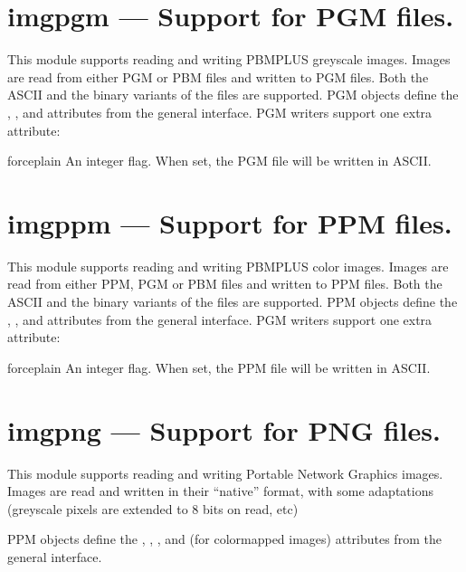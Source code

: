 \section{imgpgm ---
	Support for PGM files.}

This module supports reading and writing PBMPLUS greyscale
images. Images are read from either PGM or PBM files and written to
PGM files. Both the ASCII and the binary variants of the files are
supported.
PGM objects define the , ,  and
 attributes from the general interface. PGM
writers support one extra attribute:

\begin{memberdesc}[imgpgmwriter]{forceplain}
An integer flag. When set, the PGM file will be written in ASCII.
\end{memberdesc}


\section{imgppm ---
	Support for PPM files.}
This module supports reading and writing PBMPLUS color
images. Images are read from either PPM, PGM or PBM files and written to
PPM files. Both the ASCII and the binary variants of the files are
supported.
PPM objects define the , ,  and
 attributes from the general interface. PGM
writers support one extra attribute:

\begin{memberdesc}[imgppmwriter]{forceplain}
An integer flag. When set, the PPM file will be written in ASCII.
\end{memberdesc}

\section{imgpng ---
	Support for PNG files.}
This module supports reading and writing Portable Network Graphics
images. Images are read and written in their ``native'' format, with
some adaptations (greyscale pixels are extended to 8 bits on read, etc)

PPM objects define the , , ,
 and (for colormapped images) 
attributes from the general interface. 

